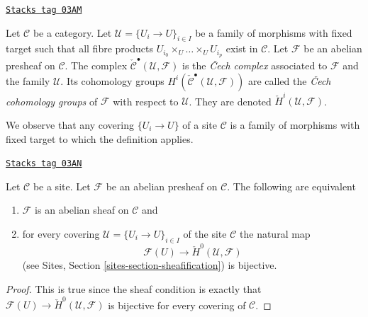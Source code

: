 \begin{definition}
\label{sites-cohomology-definition-cech-complex}
\href{https://stacks.math.columbia.edu/tag/03AM}{\texttt{Stacks tag 03AM}}

Let $\mathcal{C}$ be a category. Let $\mathcal{U} = \{U_i \to U\}_{i \in I}$
be a family of morphisms with fixed target such that all fibre products
$U_{i_0} \times_U \ldots \times_U U_{i_p}$ exist in $\mathcal{C}$.
Let $\mathcal{F}$ be an abelian presheaf on $\mathcal{C}$.
The complex $\check{\mathcal{C}}^\bullet(\mathcal{U}, \mathcal{F})$
is the {\it {\v C}ech complex} associated to $\mathcal{F}$ and the
family $\mathcal{U}$. Its cohomology groups
$H^i(\check{\mathcal{C}}^\bullet(\mathcal{U}, \mathcal{F}))$ are
called the {\it {\v C}ech cohomology groups} of $\mathcal{F}$ with respect
to $\mathcal{U}$. They are denoted $\check H^i(\mathcal{U}, \mathcal{F})$.
\end{definition}

We observe that any covering $\{U_i \to U\}$ of a site $\mathcal{C}$
is a family of morphisms with fixed target to which the definition applies.

\begin{lemma}[Cech h0]
\label{sites-cohomology-lemma-cech-h0}
\href{https://stacks.math.columbia.edu/tag/03AN}{\texttt{Stacks tag 03AN}}

Let $\mathcal{C}$ be a site.
Let $\mathcal{F}$ be an abelian presheaf on $\mathcal{C}$.
The following are equivalent
\begin{enumerate}
\item $\mathcal{F}$ is an abelian sheaf on $\mathcal{C}$ and
\item for every covering $\mathcal{U} = \{U_i \to U\}_{i \in I}$
of the site $\mathcal{C}$ the natural map
$$
\mathcal{F}(U) \to \check{H}^0(\mathcal{U}, \mathcal{F})
$$
(see Sites, Section \ref{sites-section-sheafification}) is bijective.
\end{enumerate}
\end{lemma}

\begin{proof}
This is true since the sheaf condition is exactly that
$\mathcal{F}(U) \to \check{H}^0(\mathcal{U}, \mathcal{F})$
is bijective for every covering of $\mathcal{C}$.
\end{proof}

